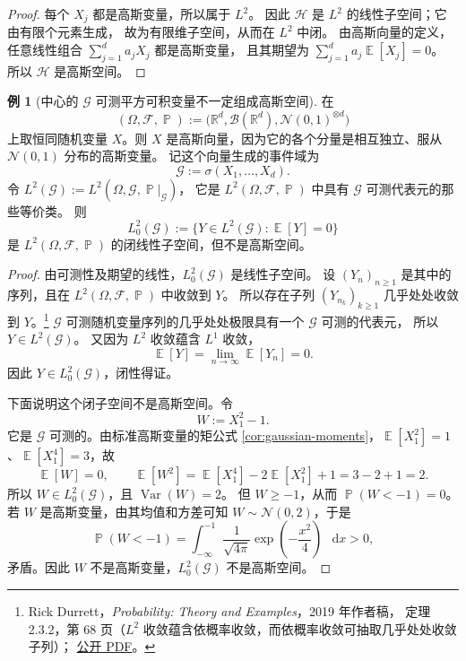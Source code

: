 \documentclass[UTF8,11pt,a4paper,oneside,fontset=fandol]{ctexrep}
\numberwithin{equation}{section}
\theoremstyle{plain}
\theoremstyle{definition}
\newtheorem{example}[theorem]{例}
\theoremstyle{remark}
\newcommand{\R}{\mathbb{R}}
\newcommand{\B}{\mathcal{B}}
\newcommand{\F}{\mathcal{F}}
\newcommand{\Hcal}{\mathcal{H}}
\DeclareMathOperator{\Prob}{\mathbb{P}}
\DeclareMathOperator{\E}{\mathbb{E}}
\DeclareMathOperator{\Var}{Var}
\newcommand{\dd}{\mathop{}\!\mathrm{d}}
\begin{document}
\begin{proof}
每个 $X_j$ 都是高斯变量，所以属于 $L^2$。
因此 $\Hcal$ 是 $L^2$ 的线性子空间；它由有限个元素生成，
故为有限维子空间，从而在 $L^2$ 中闭。
由高斯向量的定义，任意线性组合 $\sum_{j=1}^{d}a_jX_j$ 都是高斯变量，
且其期望为 $\sum_{j=1}^{d}a_j\E[X_j]=0$。
所以 $\Hcal$ 是高斯空间。
\end{proof}

\begin{example}[中心的 $\mathcal G$ 可测平方可积变量不一定组成高斯空间]
\label{ex:centered-measurable-not-gaussian-space}
在
\[
  (\Omega,\F,\Prob):=\bigl(\R^d,\B(\R^d),\mathcal{N}(0,1)^{\otimes d}\bigr)
\]
上取恒同随机变量 $X$。则 $X$ 是高斯向量，因为它的各个分量是相互独立、服从 $\mathcal{N}(0,1)$ 分布的高斯变量。
记这个向量生成的事件域为
\[
  \mathcal G:=\sigma(X_1,\ldots,X_d).
\]
令 $L^2(\mathcal G):=L^2(\Omega,\mathcal G,\Prob|_{\mathcal G})$，
它是 $L^2(\Omega,\F,\Prob)$ 中具有 $\mathcal G$ 可测代表元的那些等价类。
则
\[
  L^2_0(\mathcal G)
  :=\{Y\in L^2(\mathcal G):\E[Y]=0\}
\]
是 $L^2(\Omega,\F,\Prob)$ 的闭线性子空间，但不是高斯空间。
\end{example}

\begin{proof}
由可测性及期望的线性，$L^2_0(\mathcal G)$ 是线性子空间。
设 $(Y_n)_{n\ge1}$ 是其中的序列，且在 $L^2(\Omega,\F,\Prob)$ 中收敛到 $Y$。
所以存在子列 $(Y_{n_k})_{k\ge1}$ 几乎处处收敛到 $Y$。\footnote{%
Rick Durrett，\emph{Probability: Theory and Examples}，2019 年作者稿，
定理 2.3.2，第 68 页（$L^2$ 收敛蕴含依概率收敛，而依概率收敛可抽取几乎处处收敛子列）；
\href{https://sites.math.duke.edu/~rtd/PTE/PTE5_011119.pdf}{公开 PDF}。}
$\mathcal G$ 可测随机变量序列的几乎处处极限具有一个 $\mathcal G$ 可测的代表元，
所以 $Y\in L^2(\mathcal G)$。
又因为 $L^2$ 收敛蕴含 $L^1$ 收敛，
\[
  \E[Y]=\lim_{n\to\infty}\E[Y_n]=0.
\]
因此 $Y\in L^2_0(\mathcal G)$，闭性得证。

下面说明这个闭子空间不是高斯空间。令
\[
  W:=X_1^2-1.
\]
它是 $\mathcal G$ 可测的。由标准高斯变量的矩公式
\cref{cor:gaussian-moments}，$\E[X_1^2]=1$、$\E[X_1^4]=3$，故
\[
  \E[W]=0,\qquad
  \E[W^2]=\E[X_1^4]-2\E[X_1^2]+1=3-2+1=2.
\]
所以 $W\in L^2_0(\mathcal G)$，且 $\Var(W)=2$。
但 $W\ge-1$，从而 $\Prob(W<-1)=0$。
若 $W$ 是高斯变量，由其均值和方差可知 $W\sim\mathcal{N}(0,2)$，于是
\[
  \Prob(W<-1)
  =\int_{-\infty}^{-1}\frac{1}{\sqrt{4\pi}}
       \exp\!\left(-\frac{x^2}{4}\right)\,\dd x
  >0,
\]
矛盾。因此 $W$ 不是高斯变量，$L^2_0(\mathcal G)$ 不是高斯空间。
\end{proof}
\end{document}
